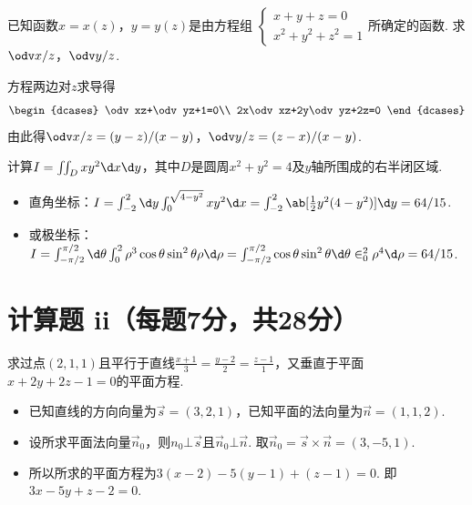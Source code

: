 \begin{problem}
    已知函数$x=x(z)$，$y=y(z)$是由方程组
    $\begin{cases}
        x+y+z=0\\x^2+y^2+z^2=1
    \end{cases}$所确定的函数. 求$\odv x/z$，$\odv y/z$.
\end{problem}
\begin{solution}
    方程两边对$z$求导得
    \[\begin{dcases}
        \odv xz+\odv yz+1=0\\
        2x\odv xz+2y\odv yz+2z=0
    \end{dcases}\]
    由此得$\odv x/z=(y-z)/(x-y)$，$\odv y/z=(z-x)/(x-y)$.
\end{solution}

\begin{problem}
    计算$I=\iint_Dxy^2\d x\d y$，其中$D$是圆周$x^2+y^2=4$及$y$轴所围成的右半闭区域.
\end{problem}
\begin{solution}\leavevmode
    \begin{itemize}
        \item 直角坐标：$I=\int_{-2}^2\d y\int_0^{\sqrt{4-y^2}}xy^2\d x=\int_{-2}^2\ab[\frac12y^2(4-y^2)]\d y=64/15$.
        \item 或极坐标：$I=\int_{-\pi/2}^{\pi/2}\d\theta\int_0^2\rho^3\cos\theta\sin^2\theta\rho\d\rho=\int_{-\pi/2}^{\pi/2}\cos\theta\sin^2\theta\d\theta\in_0^2\rho^4\d\rho=64/15$.
    \end{itemize}
\end{solution}

\makeatletter
{}
\makeatother

\section{计算题 ii（每题7分，共28分）}

\begin{problem}
    求过点$(2,1,1)$且平行于直线$\frac{x+1}{3}=\frac{y-2}{2}=\frac{z-1}{1}$，又垂直于平面$x+2y+2z-1=0$的平面方程.
\end{problem}
\begin{solution}\leavevmode
    \begin{itemize}
        \item 已知直线的方向向量为$\vec s=(3,2,1)$，已知平面的法向量为$\vec n=(1,1,2)$.
        \item 设所求平面法向量$\vec n_0$，则$n_0\bot\vec s$且$\vec n_0\bot\vec n$. 取$\vec n_0=\vec s\times\vec n=(3,-5,1)$.
        \item 所以所求的平面方程为$3(x-2)-5(y-1)+(z-1)=0$. 即$3x-5y+z-2=0$.
    \end{itemize}
\end{solution}

